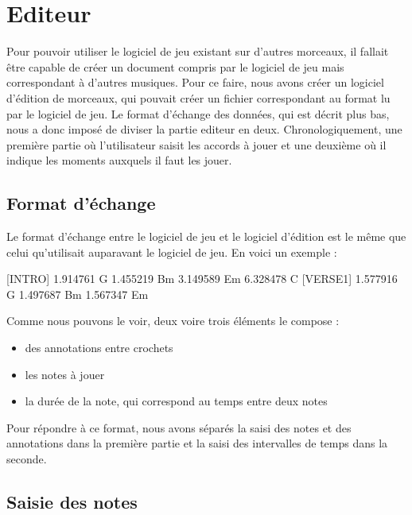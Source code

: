 \chapter{Editeur}
Pour pouvoir utiliser le logiciel de jeu existant sur d'autres morceaux, il fallait être capable de créer un document compris par le logiciel de jeu mais correspondant à d'autres musiques. Pour ce faire, nous avons créer un logiciel d'édition de morceaux, qui pouvait créer un fichier correspondant au format lu par le logiciel de jeu. Le format d'échange des données, qui est décrit plus bas, nous a donc imposé de diviser la partie editeur en deux. Chronologiquement, une première partie où l'utilisateur saisit les accords à jouer et une deuxième où il indique les moments auxquels il faut les jouer.

\section{Format d'échange}

Le format d'échange entre le logiciel de jeu et le logiciel d'édition est le même que celui qu'utilisait auparavant le logiciel de jeu.
En voici un exemple :

[INTRO]
1.914761 G
1.455219 Bm
3.149589 Em
6.328478 C
[VERSE1]
1.577916 G
1.497687 Bm
1.567347 Em

Comme nous pouvons le voir, deux voire trois éléments le compose :
\begin{itemize}
\item des annotations entre crochets
\item les notes à jouer
\item la durée de la note, qui correspond au temps entre deux notes
\end{itemize}
Pour répondre à ce format, nous avons séparés la saisi des notes et des annotations dans la première partie et la saisi des intervalles de temps dans la seconde.

\section{Saisie des notes}
